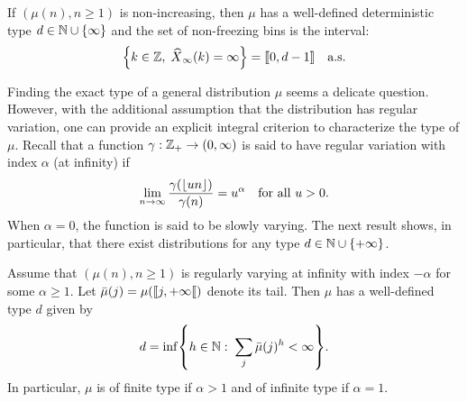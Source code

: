 \documentclass[AHL,Unicode,longabstracts,published]{cedram}
\newcommand{\bbN}{\mathbb{N}}
\newcommand{\Z}{\mathbb{Z}}
\newcommand{\floor}[1]{{\left\lfloor #1 \right\rfloor}}
\let\originalleft\left
\let\originalright\right
\renewcommand{\left}{\mathopen{}\mathclose\bgroup\originalleft}
\renewcommand{\right}{\aftergroup\egroup\originalright}
\let\oldin\in
\renewcommand{\in}{\mathchoice{\oldin}{\oldin}{\,\oldin\,}{\,\oldin\,}}
\renewcommand*{\to}{\mathchoice{\longrightarrow}{\rightarrow}{\rightarrow}{\rightarrow}}
\let\oldhat\hat
\renewcommand*{\hat}[1]{\mathchoice{\widehat{#1}}{\widehat{#1}}{\oldhat{#1}}{\oldhat{#1}}}
\newcommand{\llbracket}{\mathopen{[\mkern -2.7mu[}}
\newcommand{\rrbracket}{\mathclose{]\mkern -2.7mu]}}
\newcommand{\llbracketclose}{\mathclose{[\mkern -2.7mu[}}
\newcommand{\llb}{\llbracket}
\newcommand{\rrb}{\rrbracket}
\newcommand{\Z}{\mathbb{Z}}
\begin{document}
\begin{coro}
If $(\mu(n), n \geq 1)$ is non-increasing, then $\mu$ has a well-defined deterministic type $d \in \bbN \cup \{\infty\}$ and the set of non-freezing bins is the interval:
\[
\left\{ k\in\Z,\; \hat{X}_\infty(k) = \infty \right\} = \llb 0, d - 1 \rrb \quad \text{a.s.}
\]
\end{coro}


Finding the exact type of a general distribution $\mu$ seems a delicate question. However, with the additional assumption that the distribution has regular variation, one can provide an explicit integral criterion to characterize the type of $\mu$. Recall that a function $\gamma : \Z_+ \to (0,\infty)$ is said to have regular variation with index $\alpha$ (at infinity) if
\[
\lim_{n\to\infty}\frac{\gamma(\floor{u n})}{\gamma(n)} = u^\alpha\quad\text{for all }u>0.
\]
When $\alpha = 0$, the function is said to be slowly varying. The next result shows, in particular, that there exist distributions for any type $d \in \bbN \cup \{+\infty\}$.

\begin{theo}\label{thm:typeK}
Assume that $(\mu(n), n \geq 1)$ is regularly varying at infinity with index $-\alpha$ for some $\alpha \geq 1$. Let $\bar{\mu}(j) = \mu(\llb j, +\infty\llbracketclose)$ denote its tail. Then $\mu$ has a well-defined type $d$ given by
\[
d = \inf\left\{ h \in \bbN: \; \sum_{j} \bar{\mu}(j)^h < \infty\right\}.
\]
In particular, $\mu$ is of finite type if $\alpha > 1$ and of infinite type if $\alpha=1$.
\end{theo}
\end{document}
